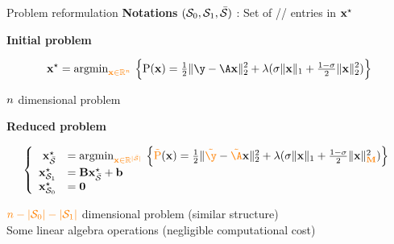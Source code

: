\documentclass[10pt]{beamer}
\begin{document}
\begin{frame}{Problem reformulation}
  \textbf{Notations}
  $(\mathcal{S}_0,\mathcal{S}_1,\bar{\mathcal{S}})$ : Set of // entries in $\mathbf{x}^{\star}$
  
  \pause
  \begin{center}
    \textbf{Initial problem}
  \end{center}
  \begin{equation*}
    \opt{\pv} = \argmin_{\emphone{\pv \in \kR^{\pdim}}} \ 
    \Big\{
    \pfunc(\pv) = 
      \tfrac{1}{2}\norm{\obs-\dic\pv}{2}^2
      + \reg (
        \enetparam\norm{\pv}{1}
        + \tfrac{1-\enetparam}{2} \norm{\pv}{2}^2
      )
    \Big\}
  \end{equation*}
  \begin{center}
    $n$ dimensional problem
  \end{center}

  \pause
  \vspace{-0.2cm}
  \begin{center}
    \vspace{0.1cm}
  \end{center}
  \vspace{-0.2cm}

  \begin{center}
    \textbf{Reduced problem}
  \end{center}
  \begin{equation*}
    \left\{
      \begin{array}{rl}
        \opt{\pv}_{\setnone} &= \argmin_{\emphone{\pv \in \kR^{\card{\setnone}}}} \ 
        \Big\{
        \emphone{\reduced{\pfunc}}(\pv) = 
          \tfrac{1}{2}\norm{\emphone{\reduced{\obs}}-\emphone{\reduced{\dic}}\pv}{2}^2
          + \reg (
            \enetparam\norm{\pv}{1}
            + \tfrac{1-\enetparam}{2} \|\pv\|{}_{\emphone{\matnorm}}^2
          )
        \Big\} \\
        \opt{\pv}_{\setone} &= \matred\opt{\pv}_{\setnone} + \vecred \\
        \opt{\pv}_{\setzero} &= \0
      \end{array}
    \right.
  \end{equation*}
  \pause
  \begin{center}
    ${\color{orange}n-|\mathcal{S}_0|-|\mathcal{S}_1|}$ dimensional problem (similar structure) \\
    Some linear algebra operations (negligible computational cost)
  \end{center}
\end{frame}
\end{document}
